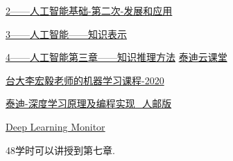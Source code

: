 \begin{pre}
\href{https://ke.qq.com/webcourse/index.html?cid=1086628&term_id=101182654&lite=1&from=800021724#taid=8423279&vid=5285890799803709554}{2——人工智能基础-第二次-发展和应用}

\href{https://github.com/zggl/AITeachingPlanDraft2020/blob/master/3-\%E4\%BA\%BA\%E5\%B7\%A5\%E6\%99\%BA\%E8\%83\%BD\%E7\%AC\%AC\%E4\%BA\%8C\%E7\%AB\%A0\%E7\%AC\%AC\%E4\%B8\%80\%E6\%AC\%A1\%E5\%B9\%BB\%E7\%81\%AF\%20\%E4\%BA\%BA\%E5\%B7\%A5\%E6\%99\%BA\%E8\%83\%BD\%E7\%9A\%84\%E7\%9F\%A5\%E8\%AF\%86\%E8\%A1\%A8\%E7\%A4\%BA.pdf}{3——人工智能——知识表示}

\href{https://github.com/zggl/AITeachingPlanDraft2020/blob/master/4-\%E4\%BA\%BA\%E5\%B7\%A5\%E6\%99\%BA\%E8\%83\%BD\%E7\%AC\%AC\%E4\%B8\%89\%E7\%AB\%A0\%E7\%AC\%AC\%E4\%B8\%80\%E6\%AC\%A1\%20\%E4\%BA\%BA\%E5\%B7\%A5\%E6\%99\%BA\%E8\%83\%BD\%E7\%9A\%84\%E7\%9F\%A5\%E8\%AF\%86\%E6\%8E\%A8\%E7\%90\%86\%E6\%96\%B9\%E6\%B3\%95.pdf}{4——人工智能第三章——知识推理方法}
\href{https://edu.tipdm.org/notification?id=32302}{泰迪云课堂}

\href{http://speech.ee.ntu.edu.tw/~tlkagk/courses_ML20.html}{台大李宏毅老师的机器学习课程-2020}

\href{https://edu.tipdm.org/classroom/122/courses}{泰迪-深度学习原理及编程实现\_人邮版}

\href{https://deeplearn.org/}{Deep Learning Monitor}

48学时可以讲授到第七章.

\end{pre} 